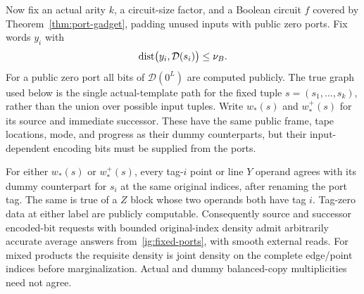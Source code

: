 Now fix an actual arity $k$, a circuit-size factor, and a Boolean circuit
$f$ covered by Theorem~\ref{thm:port-gadget}, padding unused inputs with
public zero ports. Fix words $y_i$ with
\begin{equation}\label{ig:fixed-ports}
 \operatorname{dist}\bigl(y_i,\mathcal D(s_i)\bigr)\le\nu_B.
\end{equation}
For a public zero port all bits of $\mathcal D(0^L)$ are computed publicly.
The true graph used below is the single actual-template path for the
fixed tuple $s=(s_1,\ldots,s_k)$, rather than the union over possible
input tuples. Write $w_*(s)$ and $w_*^+(s)$ for its source and immediate
successor. These have the same public frame, tape locations, mode, and
progress as their dummy counterparts, but their input-dependent encoding
bits must be supplied from the ports.

\begin{lemma}\label{ig:virtual-source}
For either $w_*(s)$ or $w_*^+(s)$, every tag-$i$ point or line $Y$
operand agrees with its dummy counterpart for $s_i$ at the same original
indices, after renaming the port tag. The same is true of a $Z$ block
whose two operands both have tag $i$. Tag-zero data at either label are
publicly computable. Consequently source and successor encoded-bit
requests with bounded original-index density admit arbitrarily accurate
average answers from~\eqref{ig:fixed-ports}, with smooth external reads.
For mixed products the requisite density is joint density on the complete
edge/point indices before marginalization. Actual and dummy balanced-copy
multiplicities need not agree.
\end{lemma}

